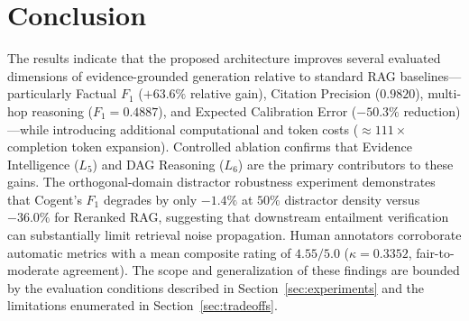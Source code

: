 \documentclass[journal,compsoc]{IEEEtran}
\begin{document}
\section{Conclusion}
The results indicate that the proposed architecture improves several evaluated dimensions of evidence-grounded generation relative to standard RAG baselines---particularly Factual $F_1$ ($+63.6\%$ relative gain), Citation Precision ($0.9820$), multi-hop reasoning ($F_1 = 0.4887$), and Expected Calibration Error ($-50.3\%$ reduction)---while introducing additional computational and token costs ($\approx 111\times$ completion token expansion). Controlled ablation confirms that Evidence Intelligence ($L_5$) and DAG Reasoning ($L_6$) are the primary contributors to these gains. The orthogonal-domain distractor robustness experiment demonstrates that Cogent's $F_1$ degrades by only $-1.4\%$ at $50\%$ distractor density versus $-36.0\%$ for Reranked RAG, suggesting that downstream entailment verification can substantially limit retrieval noise propagation. Human annotators corroborate automatic metrics with a mean composite rating of $4.55/5.0$ ($\kappa = 0.3352$, fair-to-moderate agreement). The scope and generalization of these findings are bounded by the evaluation conditions described in Section~\ref{sec:experiments} and the limitations enumerated in Section~\ref{sec:tradeoffs}.



\end{document}
